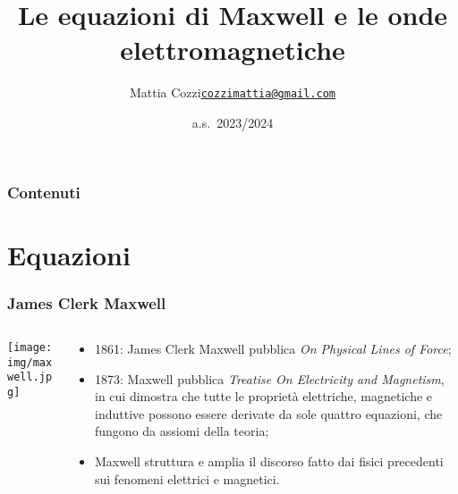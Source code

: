 \documentclass[]{beamer}
\title{Le equazioni di Maxwell e le onde elettromagnetiche}
\author{\texorpdfstring{Mattia Cozzi\newline\href{mailto:cozzimattia@gmail.com}{\texttt{cozzimattia@gmail.com}}}{Mattia Cozzi}}
\date{a.s.~2023/2024}
\theoremstyle{plain}
\begin{document}
\begin{frame}
  \titlepage
\end{frame}





\begin{frame}
\frametitle{Contenuti}
\tableofcontents
\end{frame}


\section{Equazioni}

\begin{frame}
\frametitle{James Clerk Maxwell}
\begin{columns}
\begin{column}{0.2\textwidth}
\texttt{[image: img/maxwell.jpg]}
\end{column}
\begin{column}{0.7\textwidth}
\begin{itemize}
\item<1-> 1861: James Clerk Maxwell pubblica \emph{On Physical Lines of Force};
\item<2-> 1873: Maxwell pubblica \emph{Treatise On Electricity and Magnetism}, in cui dimostra che \alert<2>{tutte le proprietà elettriche, magnetiche e induttive possono essere derivate da sole quattro equazioni}, che fungono da \alert<2>{assiomi} della teoria;
\item<3-> Maxwell struttura e amplia il discorso fatto dai fisici precedenti sui fenomeni elettrici e magnetici.
\end{itemize}
\end{column}
\end{columns}
\end{frame}
\end{document}
